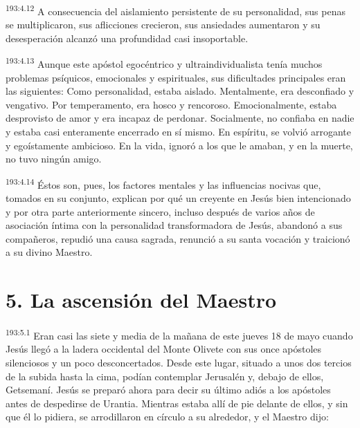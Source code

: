 \par 
\textsuperscript{193:4.12} A consecuencia del aislamiento persistente de su personalidad, sus penas se multiplicaron, sus aflicciones crecieron, sus ansiedades aumentaron y su desesperación alcanzó una profundidad casi insoportable.

\par 
\textsuperscript{193:4.13} Aunque este apóstol egocéntrico y ultraindividualista tenía muchos problemas psíquicos, emocionales y espirituales, sus dificultades principales eran las siguientes: Como personalidad, estaba aislado. Mentalmente, era desconfiado y vengativo. Por temperamento, era hosco y rencoroso. Emocionalmente, estaba desprovisto de amor y era incapaz de perdonar. Socialmente, no confiaba en nadie y estaba casi enteramente encerrado en sí mismo. En espíritu, se volvió arrogante y egoístamente ambicioso. En la vida, ignoró a los que le amaban, y en la muerte, no tuvo ningún amigo.

\par 
\textsuperscript{193:4.14} Éstos son, pues, los factores mentales y las influencias nocivas que, tomados en su conjunto, explican por qué un creyente en Jesús bien intencionado y por otra parte anteriormente sincero, incluso después de varios años de asociación íntima con la personalidad transformadora de Jesús, abandonó a sus compañeros, repudió una causa sagrada, renunció a su santa vocación y traicionó a su divino Maestro.

\section*{5. La ascensión del Maestro}
\par 
\textsuperscript{193:5.1} Eran casi las siete y media de la mañana de este jueves 18 de mayo cuando Jesús llegó a la ladera occidental del Monte Olivete con sus once apóstoles silenciosos y un poco desconcertados. Desde este lugar, situado a unos dos tercios de la subida hasta la cima, podían contemplar Jerusalén y, debajo de ellos, Getsemaní. Jesús se preparó ahora para decir su último adiós a los apóstoles antes de despedirse de Urantia. Mientras estaba allí de pie delante de ellos, y sin que él lo pidiera, se arrodillaron en círculo a su alrededor, y el Maestro dijo:

